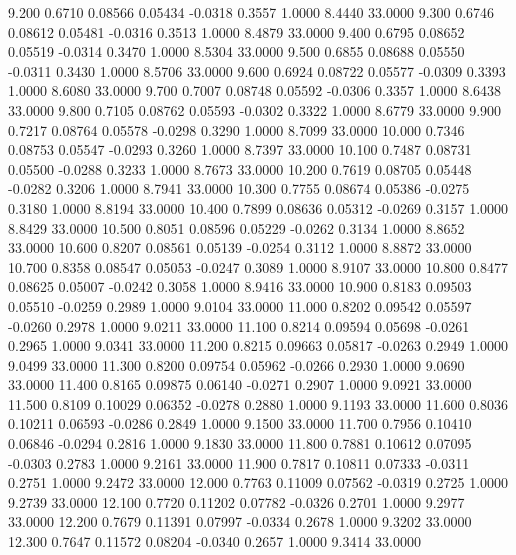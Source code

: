    9.200   0.6710   0.08566   0.05434  -0.0318   0.3557   1.0000   8.4440  33.0000
   9.300   0.6746   0.08612   0.05481  -0.0316   0.3513   1.0000   8.4879  33.0000
   9.400   0.6795   0.08652   0.05519  -0.0314   0.3470   1.0000   8.5304  33.0000
   9.500   0.6855   0.08688   0.05550  -0.0311   0.3430   1.0000   8.5706  33.0000
   9.600   0.6924   0.08722   0.05577  -0.0309   0.3393   1.0000   8.6080  33.0000
   9.700   0.7007   0.08748   0.05592  -0.0306   0.3357   1.0000   8.6438  33.0000
   9.800   0.7105   0.08762   0.05593  -0.0302   0.3322   1.0000   8.6779  33.0000
   9.900   0.7217   0.08764   0.05578  -0.0298   0.3290   1.0000   8.7099  33.0000
  10.000   0.7346   0.08753   0.05547  -0.0293   0.3260   1.0000   8.7397  33.0000
  10.100   0.7487   0.08731   0.05500  -0.0288   0.3233   1.0000   8.7673  33.0000
  10.200   0.7619   0.08705   0.05448  -0.0282   0.3206   1.0000   8.7941  33.0000
  10.300   0.7755   0.08674   0.05386  -0.0275   0.3180   1.0000   8.8194  33.0000
  10.400   0.7899   0.08636   0.05312  -0.0269   0.3157   1.0000   8.8429  33.0000
  10.500   0.8051   0.08596   0.05229  -0.0262   0.3134   1.0000   8.8652  33.0000
  10.600   0.8207   0.08561   0.05139  -0.0254   0.3112   1.0000   8.8872  33.0000
  10.700   0.8358   0.08547   0.05053  -0.0247   0.3089   1.0000   8.9107  33.0000
  10.800   0.8477   0.08625   0.05007  -0.0242   0.3058   1.0000   8.9416  33.0000
  10.900   0.8183   0.09503   0.05510  -0.0259   0.2989   1.0000   9.0104  33.0000
  11.000   0.8202   0.09542   0.05597  -0.0260   0.2978   1.0000   9.0211  33.0000
  11.100   0.8214   0.09594   0.05698  -0.0261   0.2965   1.0000   9.0341  33.0000
  11.200   0.8215   0.09663   0.05817  -0.0263   0.2949   1.0000   9.0499  33.0000
  11.300   0.8200   0.09754   0.05962  -0.0266   0.2930   1.0000   9.0690  33.0000
  11.400   0.8165   0.09875   0.06140  -0.0271   0.2907   1.0000   9.0921  33.0000
  11.500   0.8109   0.10029   0.06352  -0.0278   0.2880   1.0000   9.1193  33.0000
  11.600   0.8036   0.10211   0.06593  -0.0286   0.2849   1.0000   9.1500  33.0000
  11.700   0.7956   0.10410   0.06846  -0.0294   0.2816   1.0000   9.1830  33.0000
  11.800   0.7881   0.10612   0.07095  -0.0303   0.2783   1.0000   9.2161  33.0000
  11.900   0.7817   0.10811   0.07333  -0.0311   0.2751   1.0000   9.2472  33.0000
  12.000   0.7763   0.11009   0.07562  -0.0319   0.2725   1.0000   9.2739  33.0000
  12.100   0.7720   0.11202   0.07782  -0.0326   0.2701   1.0000   9.2977  33.0000
  12.200   0.7679   0.11391   0.07997  -0.0334   0.2678   1.0000   9.3202  33.0000
  12.300   0.7647   0.11572   0.08204  -0.0340   0.2657   1.0000   9.3414  33.0000
